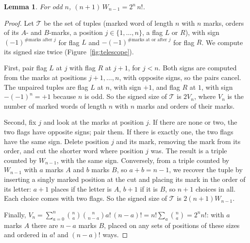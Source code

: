 \documentclass[11pt]{amsart}
\newtheorem{lemma}[theorem]{Lemma}
\theoremstyle{remark}
\begin{document}
\begin{lemma}\label{lem:W}
For odd $n$, $(n+1)\,W_{n-1}=2^n\,n!$.
\end{lemma}

\begin{proof}
Let $\mathcal T$ be the set of tuples (marked word of length $n$ with $n$ marks, orders of its $A$- and $B$-marks,
a position $j\in\{1,\dots,n\}$, a flag $L$ or $R$), with sign $(-1)^{\#\text{marks after }j}$ for flag $L$ and
$-(-1)^{\#\text{marks at or after }j}$ for flag $R$. We compute its signed size twice (Figure~\ref{fig:telescope}).

First, pair flag $L$ at $j$ with flag $R$ at $j+1$, for $j<n$. Both signs are computed from the marks at positions
$j+1,\dots,n$, with opposite signs, so the pairs cancel. The unpaired tuples are flag $L$ at $n$, with sign $+1$, and
flag $R$ at $1$, with sign $-(-1)^n=+1$ because $n$ is odd. So the signed size of $\mathcal T$ is $2V_n$, where $V_n$
is the number of marked words of length $n$ with $n$ marks and orders of their marks.

Second, fix $j$ and look at the marks at position $j$. If there are none or two, the two flags have opposite signs;
pair them. If there is exactly one, the two flags have the same sign. Delete position $j$ and its mark, removing the
mark from its order, and cut the shorter word where position $j$ was. The result is a triple counted by $W_{n-1}$,
with the same sign. Conversely, from a triple counted by $W_{n-1}$ with $a$ marks $A$ and $b$ marks $B$, so
$a+b=n-1$, we recover the tuple by inserting a singly marked position at the cut and placing its mark in the order of
its letter: $a+1$ places if the letter is $A$, $b+1$ if it is $B$, so $n+1$ choices in all. Each choice comes with two
flags. So the signed size of $\mathcal T$ is $2(n+1)W_{n-1}$.

Finally, $V_n=\sum_{a=0}^n\binom na\binom n{n-a}a!\,(n-a)!=n!\sum_a\binom na=2^n n!$: with $a$ marks $A$ there are
$n-a$ marks $B$, placed on any sets of positions of these sizes and ordered in $a!$ and $(n-a)!$ ways.
\end{proof}
\end{document}
